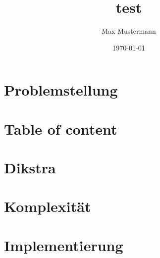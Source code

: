 \documentclass{beamer}
\title{test}
\author{Max Mustermann}
\date{\today}
\institute{Fachhochschule Trier}
\begin{document}
\maketitle

\section{Problemstellung}


\section*{Table of content}
\begin{frame}
	\tableofcontents
\end{frame}

\section{Dikstra}



\section{Komplexität}


\section{Implementierung}

\end{document}
